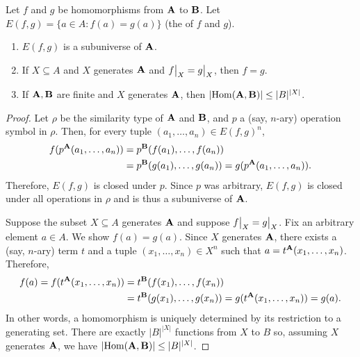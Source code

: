 \begin{lemma}
  \label{ex:1.16.6} 
  Let $f$ and $g$ be homomorphisms from $\mathbf{A}$ to $\mathbf{B}$.
  Let $E(f,g) = \{ a \in A : f(a) = g(a) \}$ (the  of $f$ and $g$). 
  \begin{enumerate}
    \item	$E(f,g)$ is a subuniverse of $\mathbf{A}$.
    \item If $X \subseteq A$ and $X$ generates $\mathbf{A}$ and
    $\restr{f}{X} = \restr{g}{X}$, then $f = g$. 
    \item If $\mathbf{A}, \mathbf{B}$ are finite and $X$ generates $\mathbf{A}$, 
    then $|\!\operatorname{Hom}(\mathbf{A},\mathbf{B})| \leq |B|^{|X|}$.
  \end{enumerate}
\end{lemma}
\begin{proof}
  Let $\rho$ be the similarity type of $\mathbf{A}$ and $\mathbf{B}$, and 
  $p$ a (say, $n$-ary) operation symbol in $\rho$. Then, 
  for every tuple $(a_1, \dots, a_n) \in E(f,g)^n$,
  \begin{align*}
    f(p^{\mathbf{A}}(a_1, \dots, a_n)) &= p^{\mathbf{B}}(f(a_1), \dots, f(a_n))\\
                                    &= p^{\mathbf{B}}(g(a_1), \dots, g(a_n))
                                     = g(p^{\mathbf{A}}(a_1, \dots, a_n)).
  \end{align*}
  Therefore, $E(f,g)$ is closed under $p$.  Since $p$ was arbitrary, 
  $E(f,g)$ is closed under all operations in $\rho$ and is thus a 
  subuniverse of $\mathbf{A}$.

  Suppose the subset $X \subseteq A$ generates $\mathbf{A}$ and suppose
  $\restr{f}{X} = \restr{g}{X}$.
  Fix an arbitrary element $a\in A$.  We show $f(a) = g(a)$.
  Since $X$ generates $\mathbf{A}$, there exists a (say, $n$-ary) term $t$ and 
  a tuple $(x_1, \dots, x_n) \in X^n$ such that 
  $a = t^{\mathbf{A}}(x_1, \dots, x_n)$. Therefore, 
  \begin{align*}
    f(a) = f(t^{\mathbf{A}}(x_1, \dots, x_n)) &= t^{\mathbf{B}}(f(x_1), \dots, f(x_n))\\
                                    &= t^{\mathbf{B}}(g(x_1), \dots, g(x_n))
                                     = g(t^{\mathbf{A}}(x_1, \dots, x_n)) = g(a).
  \end{align*}
  In other words, a homomorphism is uniquely determined by its restriction to 
  a generating set. There are exactly $|B|^{|X|}$ functions from $X$ to $B$ so, 
  assuming $X$ generates $\mathbf{A}$, we have
  $|\!\operatorname{Hom}(\mathbf{A},\mathbf{B})| \leq |B|^{|X|}$.
\end{proof}

